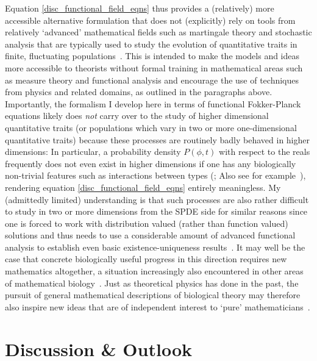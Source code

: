 Equation \eqref{disc_functional_field_eqns} thus provides a (relatively) more accessible alternative formulation that does not (explicitly) rely on tools from relatively `advanced' mathematical fields such as martingale theory and stochastic analysis that are typically used to study the evolution of quantitative traits in finite, fluctuating populations~\citep{dawson_stochastic_1975,fleming_measure-valued_1979,ethier_markov_1986,champagnat_unifying_2006,etheridge_mathematical_2011,week_white_2021}. This is intended to make the models and ideas more accessible to theorists without formal training in mathematical areas such as measure theory and functional analysis and encourage the use of techniques from physics and related domains, as outlined in the paragraphs above. Importantly, the formalism I develop here in terms of functional Fokker-Planck equations likely does \emph{not} carry over to the study of higher dimensional quantitative traits (or populations which vary in two or more one-dimensional quantitative traits) because these processes are routinely badly behaved in higher dimensions: In particular, a probability density $P(\phi,t)$ with respect to the reals frequently does not even exist in higher dimensions if one has any biologically non-trivial features such as interactions between types (\cite{fleming_measure-valued_1979, walsh_introduction_1986}; Also see for example~\cite{evans_measure-valued_1994}), rendering equation \eqref{disc_functional_field_eqns} entirely meaningless. My (admittedly limited) understanding is that such processes are also rather difficult to study in two or more dimensions from the SPDE side for similar reasons since one is forced to work with distribution valued (rather than function valued) solutions and thus needs to use a considerable amount of advanced functional analysis to establish even basic existence-uniqueness results~\citep{walsh_introduction_1986,carmona_stochastic_1999,prevot_concise_2007,liu_stochastic_2015,balan_gentle_2018}. It may well be the case that concrete biologically useful progress in this direction requires new mathematics altogether, a situation increasingly also encountered in other areas of mathematical biology~\citep{vittadello_open_2022}. Just as theoretical physics has done in the past, the pursuit of general mathematical descriptions of biological theory may therefore also inspire new ideas that are of independent interest to `pure' mathematicians~\citep{cohen_mathematics_2004}.


\section{Discussion \& Outlook}\label{sec_disc}

